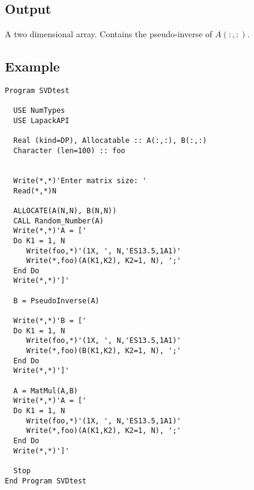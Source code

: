 \subsection{Output}

A two dimensional array. Contains the pseudo-inverse of $A(:,:)$.

\subsection{Example}

\begin{lstlisting}[emph=PseudoInverse,
                   emphstyle=\color{blue},
                   frame=trBL,
                   caption=Using lapack library to compute the inverse.,
                   label=pseudoinverse]
Program SVDtest

  USE NumTypes
  USE LapackAPI

  Real (kind=DP), Allocatable :: A(:,:), B(:,:)
  Character (len=100) :: foo
  

  Write(*,*)'Enter matrix size: '
  Read(*,*)N

  ALLOCATE(A(N,N), B(N,N))
  CALL Random_Number(A)
  Write(*,*)'A = ['
  Do K1 = 1, N
     Write(foo,*)'(1X, ', N,'ES13.5,1A1)'
     Write(*,foo)(A(K1,K2), K2=1, N), ';'
  End Do
  Write(*,*)']'

  B = PseudoInverse(A)

  Write(*,*)'B = ['
  Do K1 = 1, N
     Write(foo,*)'(1X, ', N,'ES13.5,1A1)'
     Write(*,foo)(B(K1,K2), K2=1, N), ';'
  End Do
  Write(*,*)']'

  A = MatMul(A,B)
  Write(*,*)'A = ['
  Do K1 = 1, N
     Write(foo,*)'(1X, ', N,'ES13.5,1A1)'
     Write(*,foo)(A(K1,K2), K2=1, N), ';'
  End Do
  Write(*,*)']'

  Stop
End Program SVDtest
\end{lstlisting}






